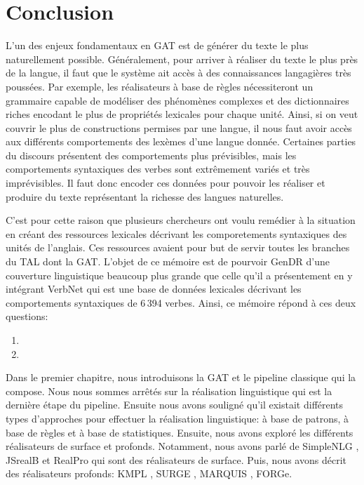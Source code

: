 
\chapter*{Conclusion}
L'un des enjeux fondamentaux en \ac{GAT} est de générer du texte le plus naturellement possible. Généralement, pour arriver à réaliser du texte le plus près de la langue, il faut que le système ait accès à des connaissances langagières très poussées. Par exemple, les réalisateurs à base de règles nécessiteront un grammaire capable de modéliser des phénomènes complexes et des dictionnaires riches encodant le plus de propriétés lexicales pour chaque unité. Ainsi, si on veut couvrir le plus de constructions permises par une langue, il nous faut avoir accès aux différents comportements des lexèmes d'une langue donnée. Certaines parties du discours présentent des comportements plus prévisibles, mais les comportements syntaxiques des verbes sont extrêmement variés et très imprévisibles. Il faut donc encoder ces données pour pouvoir les réaliser et produire du texte représentant la richesse des langues naturelles.

C'est pour cette raison que plusieurs chercheurs ont voulu remédier à la situation en créant des ressources lexicales décrivant les comporetements syntaxiques des unités de l'anglais. Ces ressources avaient pour but de servir toutes les branches du \ac{TAL} dont la \ac{GAT}. L'objet de ce mémoire est de pourvoir GenDR d'une couverture linguistique beaucoup plus grande que celle qu'il a présentement en y intégrant VerbNet qui est une base de données lexicales décrivant les comportements syntaxiques de 6\,394 verbes. Ainsi, ce mémoire répond à ces deux questions:

\begin{enumerate}
  \item {}
  \item {}
\end{enumerate}

Dans le premier chapitre, nous introduisons la \ac{GAT} et le pipeline classique qui la compose. Nous nous sommes arrêtés sur la réalisation linguistique qui est la dernière étape du pipeline. Ensuite nous avons souligné qu'il existait différents types d'approches pour effectuer la réalisation linguistique: à base de patrons, à base de règles et à base de statistiques. Ensuite, nous avons exploré les différents réalisateurs de surface et profonds. Notamment, nous avons parlé de SimpleNLG \citep{GattSimpleNLGRealisationEngine2009}, JSrealB \citep{MolinsJSrealBBilingualText2015} et RealPro \citep{LavoieFastPortableRealizer1997}qui sont des réalisateurs de surface. Puis, nous avons décrit des réalisateurs profonds: KMPL \cite{BatemanEnablingTechnologyMultilingual1997}, SURGE \citep{Elhadad98surge:a}, MARQUIS \citep{WannerMARQUISGENERATIONUSERTAILORED2010}, FORGe\citep{MilledemoFORGePompeu2017}.

